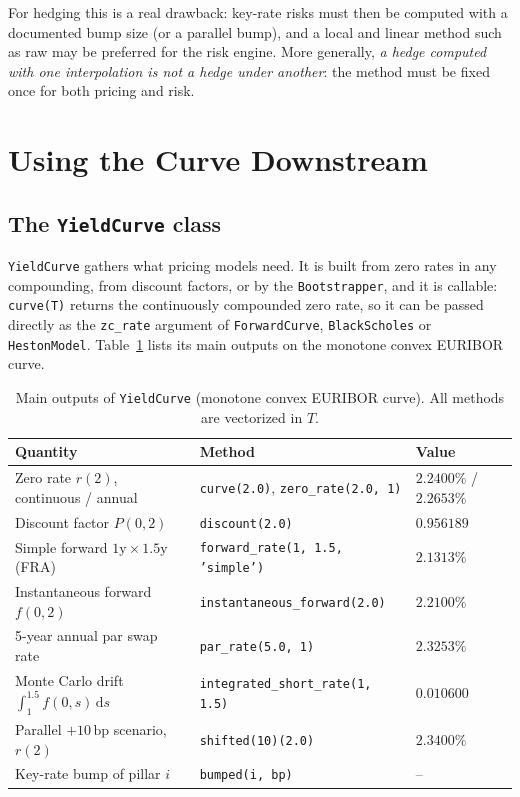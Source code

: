\documentclass[11pt,a4paper]{article}
\theoremstyle{plain}
\theoremstyle{definition}
\newcommand{\dd}{\mathrm{d}}
\newcommand{\bp}{\,\mathrm{bp}}
\begin{document}
For hedging this is a real drawback: key-rate risks must then be computed with a documented bump size (or a parallel bump), and a local and linear method such as raw may be preferred for the risk engine. More generally, \emph{a hedge computed with one interpolation is not a hedge under another}: the method must be fixed once for both pricing and risk.

\clearpage
\section{Using the Curve Downstream}
\label{sec:downstream}

\subsection{The \texttt{YieldCurve} class}
\texttt{YieldCurve} gathers what pricing models need. It is built from zero rates in any compounding, from discount factors, or by the \texttt{Bootstrapper}, and it is callable: \texttt{curve(T)} returns the continuously compounded zero rate, so it can be passed directly as the \texttt{zc\_rate} argument of \texttt{ForwardCurve}, \texttt{BlackScholes} or \texttt{HestonModel}. Table~\ref{tab:downstream} lists its main outputs on the monotone convex EURIBOR curve.

\begin{table}[htbp]
\centering
\small
\begin{tabular}{@{}lll@{}}
\toprule
Quantity & Method & Value \\
\midrule
Zero rate $r(2)$, continuous / annual & \texttt{curve(2.0)}, \texttt{zero\_rate(2.0, 1)} & $2.2400\%$ / $2.2653\%$ \\
Discount factor $P(0,2)$ & \texttt{discount(2.0)} & $0.956189$ \\
Simple forward $1\text{y}\times1.5\text{y}$ (FRA) & \texttt{forward\_rate(1, 1.5, 'simple')} & $2.1313\%$ \\
Instantaneous forward $f(0,2)$ & \texttt{instantaneous\_forward(2.0)} & $2.2100\%$ \\
5-year annual par swap rate & \texttt{par\_rate(5.0, 1)} & $2.3253\%$ \\
Monte Carlo drift $\int_1^{1.5}f(0,s)\,\dd s$ & \texttt{integrated\_short\_rate(1, 1.5)} & $0.010600$ \\
Parallel $+10\bp$ scenario, $r(2)$ & \texttt{shifted(10)(2.0)} & $2.3400\%$ \\
Key-rate bump of pillar $i$ & \texttt{bumped(i, bp)} & -- \\
\bottomrule
\end{tabular}
\caption{Main outputs of \texttt{YieldCurve} (monotone convex EURIBOR curve). All methods are vectorized in $T$.}
\label{tab:downstream}
\end{table}
\end{document}
